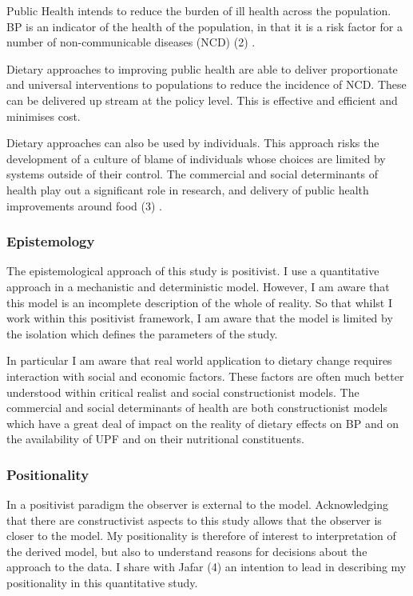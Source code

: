 \documentclass[
]{article}
\begin{document}
Public Health intends to reduce the burden of ill health across the
population. BP is an indicator of the health of the population, in that
it is a risk factor for a number of non-communicable diseases (NCD) (2)
.

Dietary approaches to improving public health are able to deliver
proportionate and universal interventions to populations to reduce the
incidence of NCD. These can be delivered up stream at the policy level.
This is effective and efficient and minimises cost.

Dietary approaches can also be used by individuals. This approach risks
the development of a culture of blame of individuals whose choices are
limited by systems outside of their control. The commercial and social
determinants of health play out a significant role in research, and
delivery of public health improvements around food (3) .

\hypertarget{epistemology}{%
\subsubsection{Epistemology}\label{epistemology}}

The epistemological approach of this study is positivist. I use a
quantitative approach in a mechanistic and deterministic model. However,
I am aware that this model is an incomplete description of the whole of
reality. So that whilst I work within this positivist framework, I am
aware that the model is limited by the isolation which defines the
parameters of the study.

In particular I am aware that real world application to dietary change
requires interaction with social and economic factors. These factors are
often much better understood within critical realist and social
constructionist models. The commercial and social determinants of health
are both constructionist models which have a great deal of impact on the
reality of dietary effects on BP and on the availability of UPF and on
their nutritional constituents.

\hypertarget{positionality}{%
\subsubsection{Positionality}\label{positionality}}

In a positivist paradigm the observer is external to the model.
Acknowledging that there are constructivist aspects to this study allows
that the observer is closer to the model. My positionality is therefore
of interest to interpretation of the derived model, but also to
understand reasons for decisions about the approach to the data. I share
with Jafar (4) an intention to lead in describing my positionality in
this quantitative study.
\end{document}

